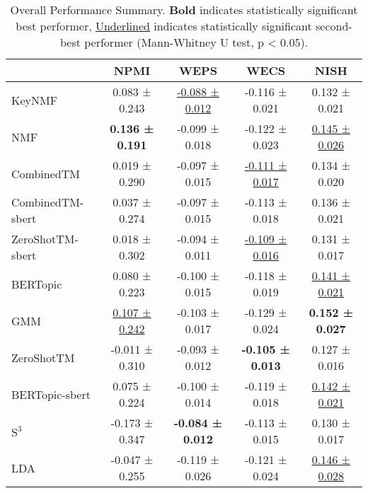 \begin{table}
\caption{Overall Performance Summary. \textbf{Bold} indicates statistically significant best performer, \underline{Underlined} indicates statistically significant second-best performer (Mann-Whitney U test, p < 0.05).}
\label{tab:performance_summary}
\begin{tabular}{lcccc}
\toprule
 & NPMI & WEPS & WECS & NISH \\
\midrule
KeyNMF & 0.083 ± 0.243 & \underline{-0.088 ± 0.012} & -0.116 ± 0.021 & 0.132 ± 0.021 \\
NMF & \textbf{0.136 ± 0.191} & -0.099 ± 0.018 & -0.122 ± 0.023 & \underline{0.145 ± 0.026} \\
CombinedTM & 0.019 ± 0.290 & -0.097 ± 0.015 & \underline{-0.111 ± 0.017} & 0.134 ± 0.020 \\
CombinedTM-sbert & 0.037 ± 0.274 & -0.097 ± 0.015 & -0.113 ± 0.018 & 0.136 ± 0.021 \\
ZeroShotTM-sbert & 0.018 ± 0.302 & -0.094 ± 0.011 & \underline{-0.109 ± 0.016} & 0.131 ± 0.017 \\
BERTopic & 0.080 ± 0.223 & -0.100 ± 0.015 & -0.118 ± 0.019 & \underline{0.141 ± 0.021} \\
GMM & \underline{0.107 ± 0.242} & -0.103 ± 0.017 & -0.129 ± 0.024 & \textbf{0.152 ± 0.027} \\
ZeroShotTM & -0.011 ± 0.310 & -0.093 ± 0.012 & \textbf{-0.105 ± 0.013} & 0.127 ± 0.016 \\
BERTopic-sbert & 0.075 ± 0.224 & -0.100 ± 0.014 & -0.119 ± 0.018 & \underline{0.142 ± 0.021} \\
$\text{S}^3$ & -0.173 ± 0.347 & \textbf{-0.084 ± 0.012} & -0.113 ± 0.015 & 0.130 ± 0.017 \\
LDA & -0.047 ± 0.255 & -0.119 ± 0.026 & -0.121 ± 0.024 & \underline{0.146 ± 0.028} \\
\bottomrule
\end{tabular}
\end{table}
